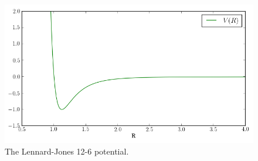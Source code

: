 \begin{frame}
 \begin{figure}
 \begin{center}
  \includegraphics[scale=0.5]{../graphics/R_VS_E/LD.png}
  \caption{The Lennard-Jones 12-6 potential.}
  \label{fig:LennardJones}
   \end{center}
\end{figure}
\end{frame}












